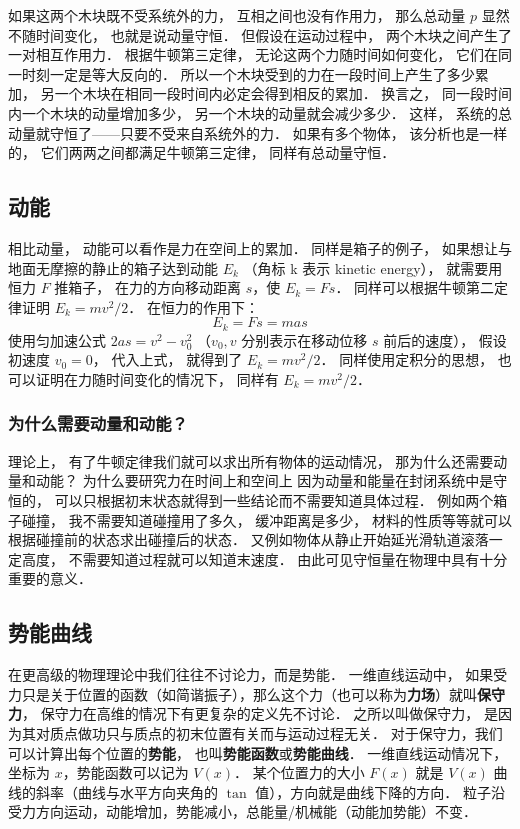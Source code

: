如果这两个木块既不受系统外的力， 互相之间也没有作用力， 那么总动量 $p$ 显然不随时间变化， 也就是说动量守恒． 但假设在运动过程中， 两个木块之间产生了一对相互作用力． 根据牛顿第三定律， 无论这两个力随时间如何变化， 它们在同一时刻一定是等大反向的． 所以一个木块受到的力在一段时间上产生了多少累加， 另一个木块在相同一段时间内必定会得到相反的累加． 换言之， 同一段时间内一个木块的动量增加多少， 另一个木块的动量就会减少多少． 这样， 系统的总动量就守恒了——只要不受来自系统外的力． 如果有多个物体， 该分析也是一样的， 它们两两之间都满足牛顿第三定律， 同样有总动量守恒．

\subsection{动能}
相比动量， 动能可以看作是力在空间上的累加． 同样是箱子的例子， 如果想让与地面无摩擦的静止的箱子达到动能 $E_k$ （角标 k 表示 kinetic energy）， 就需要用恒力 $F$ 推箱子， 在力的方向移动距离 $s$，使 $E_k = Fs$． 同样可以根据牛顿第二定律证明 $E_k = mv^2/2$． 在恒力的作用下：
\begin{equation}
E_k = Fs = mas
\end{equation}
使用匀加速公式 $2as = v^2 - v_0^2$ （$v_0, v$ 分别表示在移动位移 $s$ 前后的速度）， 假设初速度 $v_0 = 0$， 代入上式， 就得到了 $E_k = mv^2/2$． 同样使用定积分的思想， 也可以证明在力随时间变化的情况下， 同样有 $E_k = mv^2/2$．

\subsubsection{为什么需要动量和动能？}
理论上， 有了牛顿定律我们就可以求出所有物体的运动情况， 那为什么还需要动量和动能？ 为什么要研究力在时间上和空间上 因为动量和能量在封闭系统中是守恒的， 可以只根据初末状态就得到一些结论而不需要知道具体过程． 例如两个箱子碰撞， 我不需要知道碰撞用了多久， 缓冲距离是多少， 材料的性质等等就可以根据碰撞前的状态求出碰撞后的状态． 又例如物体从静止开始延光滑轨道滚落一定高度， 不需要知道过程就可以知道末速度． 由此可见守恒量在物理中具有十分重要的意义．

\subsection{势能曲线}
在更高级的物理理论中我们往往不讨论力，而是势能． 一维直线运动中， 如果受力只是关于位置的函数（如简谐振子），那么这个力（也可以称为\textbf{力场}）就叫\textbf{保守力}， 保守力在高维的情况下有更复杂的定义先不讨论． 之所以叫做保守力， 是因为其对质点做功只与质点的初末位置有关而与运动过程无关． 对于保守力，我们可以计算出每个位置的\textbf{势能}， 也叫\textbf{势能函数}或\textbf{势能曲线}． 一维直线运动情况下，坐标为 $x$，势能函数可以记为 $V(x)$． 某个位置力的大小 $F(x)$ 就是 $V(x)$ 曲线的斜率（曲线与水平方向夹角的 $\tan$ 值），方向就是曲线下降的方向． 粒子沿受力方向运动，动能增加，势能减小，总能量/机械能（动能加势能）不变．

